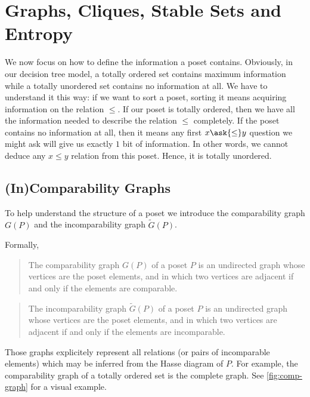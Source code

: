 \section{Graphs, Cliques, Stable Sets and Entropy}
\label{tree:poset:graph}

We now focus on how to define the information a poset contains. Obviously, in
our decision tree model, a totally ordered set contains maximum information
while a totally unordered set contains no information at all. We have to
understand it this way: if we want to sort a poset, sorting it means acquiring
information on the relation $\le$. If our poset is totally ordered, then we
have all the information needed to describe the relation $\le$ completely. If
the poset contains no information at all, then it means any first $x \ask{\le}
y$ question we might ask will give us exactly $1$ bit of information. In other
words, we cannot deduce any $x \le y$ relation from this poset. Hence, it is
totally unordered.

\subsection*{(In)Comparability Graphs}

To help understand the structure of a poset we introduce the comparability
graph ${G}(P)$ and the incomparability graph $\widetilde{G}(P)$.

Formally,

\begin{quotation}
The comparability graph ${G}(P)$ of a poset $P$ is an undirected graph whose
vertices are the poset elements, and in which two vertices are adjacent if and
only if the elements are comparable.
\end{quotation}

\begin{quotation}
The incomparability graph $\widetilde{G}(P)$ of a poset $P$ is an undirected
graph whose vertices are the poset elements, and in which two vertices are
adjacent if and only if the elements are incomparable.
\end{quotation}



Those graphs explicitely represent all relations (or pairs of incomparable
elements) which may be inferred from the Hasse diagram of ${P}$. For example,
the comparability graph of a totally ordered set is the complete graph. See
\ref{fig:comp-graph} for a visual example.



